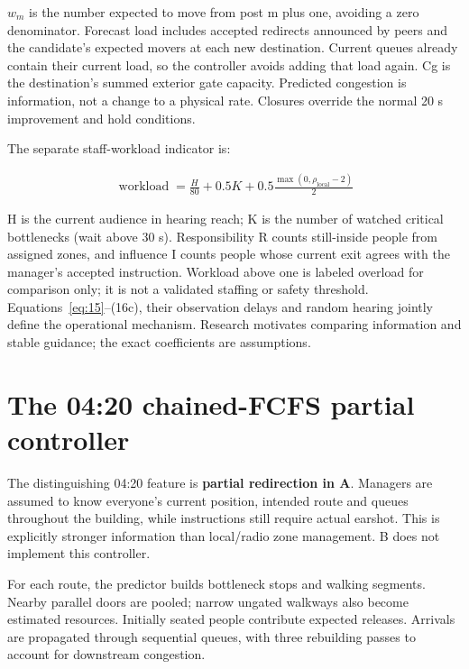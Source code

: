 \documentclass[11pt,a4paper]{article}
\begin{document}
\ensuremath{w_{m}} is the number expected to move from post m plus one, avoiding a zero denominator. Forecast load includes accepted redirects announced by peers and the candidate's expected movers at each new destination. Current queues already contain their current load, so the controller avoids adding that load again. Cg is the destination's summed exterior gate capacity. Predicted congestion is information, not a change to a physical rate. Closures override the normal 20 s improvement and hold conditions.


The separate staff-workload indicator is:


\begin{equation}
\begin{aligned}
\operatorname{workload}=\frac H{80}+0.5K+0.5\frac{\max(0,\rho_{\mathrm{local}}-2)}2
\end{aligned}
\tag{16c}\label{eq:16c}
\end{equation}

H is the current audience in hearing reach; K is the number of watched critical bottlenecks (wait above 30 s). Responsibility R counts still-inside people from assigned zones, and influence I counts people whose current exit agrees with the manager's accepted instruction. Workload above one is labeled overload for comparison only; it is not a validated staffing or safety threshold. Equations~\eqref{eq:15}–(16c), their observation delays and random hearing jointly define the operational mechanism. Research \cite{R7,R10} motivates comparing information and stable guidance; the exact coefficients are assumptions.


\section{The 04:20 chained-FCFS partial controller}\label{sec:11}

The distinguishing 04:20 feature is \textbf{partial redirection in A}. Managers are assumed to know everyone’s current position, intended route and queues throughout the building, while instructions still require actual earshot. This is explicitly stronger information than local/radio zone management. B does not implement this controller.


For each route, the predictor builds bottleneck stops and walking segments. Nearby parallel doors are pooled; narrow ungated walkways also become estimated resources. Initially seated people contribute expected releases. Arrivals are propagated through sequential queues, with three rebuilding passes to account for downstream congestion.
\end{document}
